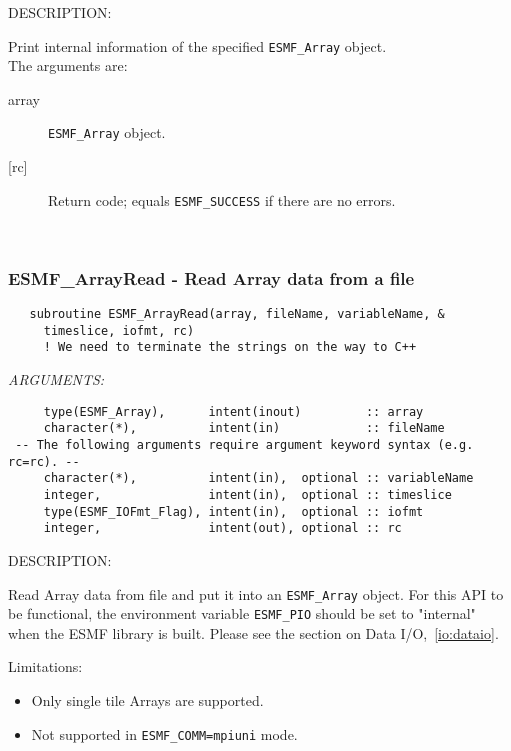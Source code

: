 {\sf DESCRIPTION:\\ }


     Print internal information of the specified {\tt ESMF\_Array} object. \\
  
     The arguments are:
     \begin{description}
     \item[array] 
       {\tt ESMF\_Array} object.
     \item[{[rc]}] 
       Return code; equals {\tt ESMF\_SUCCESS} if there are no errors.
     \end{description}
   
 
\mbox{}\hrulefill\ 
 
\subsubsection [ESMF\_ArrayRead] {ESMF\_ArrayRead - Read Array data from a file}


   \label{api:ArrayRead}
  
\begin{verbatim}   subroutine ESMF_ArrayRead(array, fileName, variableName, &
     timeslice, iofmt, rc)
     ! We need to terminate the strings on the way to C++\end{verbatim}{\em ARGUMENTS:}
\begin{verbatim}     type(ESMF_Array),      intent(inout)         :: array
     character(*),          intent(in)            :: fileName
 -- The following arguments require argument keyword syntax (e.g. rc=rc). --
     character(*),          intent(in),  optional :: variableName
     integer,               intent(in),  optional :: timeslice
     type(ESMF_IOFmt_Flag), intent(in),  optional :: iofmt
     integer,               intent(out), optional :: rc\end{verbatim}
{\sf DESCRIPTION:\\ }


     Read Array data from file and put it into an {\tt ESMF\_Array} object.
     For this API to be functional, the environment variable {\tt ESMF\_PIO}
     should be set to "internal" when the ESMF library is built.
     Please see the section on Data I/O,~\ref{io:dataio}.
   
     Limitations:
     \begin{itemize}
       \item Only single tile Arrays are supported.
       \item Not supported in {\tt ESMF\_COMM=mpiuni} mode.
     \end{itemize}
  
